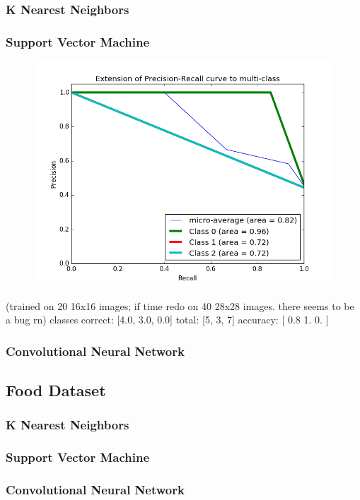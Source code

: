 \documentclass[leqno]{article}
\begin{document}
\subsubsection{K Nearest Neighbors}
\subsubsection{Support Vector Machine}
\begin{figure}[h!]
  \centering
  \includegraphics[width=15cm]{svm_pr_hand.png}
\end{figure}
(trained on 20 16x16 images; if time redo on 40 28x28 images. there seems to be
a bug rn)
classes correct:  [4.0, 3.0, 0.0]
total:  [5, 3, 7]
accuracy:  [ 0.8  1.   0. ]

\subsubsection{Convolutional Neural Network}

\subsection{Food Dataset}
\subsubsection{K Nearest Neighbors}
\subsubsection{Support Vector Machine}
\subsubsection{Convolutional Neural Network}
\end{document}
